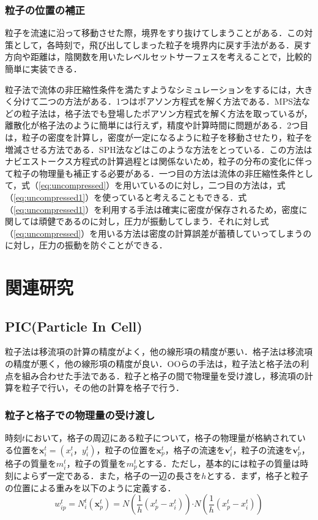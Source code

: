 \documentclass[a4j,12pt]{jreport}
\begin{document}
\subsubsection{粒子の位置の補正} \label{subsec:fixparticlepos}
粒子を流速に沿って移動させた際，境界をすり抜けてしまうことがある．この対策として，各時刻で，飛び出してしまった粒子を境界内に戻す手法がある．戻す方向や距離は，陰関数を用いたレベルセットサーフェスを考えることで，比較的簡単に実装できる．

粒子法で流体の非圧縮性条件を満たすようなシミュレーションをするには，大きく分けて二つの方法がある．1つはポアソン方程式を解く方法である．MPS法などの粒子法は，格子法でも登場したポアソン方程式を解く方法を取っているが，離散化が格子法のように簡単には行えず，精度や計算時間に問題がある．2つ目は，粒子の密度を計算し，密度が一定になるように粒子を移動させたり，粒子を増減させる方法である．SPH法などはこのような方法をとっている．この方法はナビエストークス方程式の計算過程とは関係ないため，粒子の分布の変化に伴って粒子の物理量も補正する必要がある．一つ目の方法は流体の非圧縮性条件として，式（\ref{eq:uncompressed}）を用いているのに対し，二つ目の方法は，式（\ref{eq:uncompressed1}）を使っていると考えることもできる．式（\ref{eq:uncompressed1}）を利用する手法は確実に密度が保存されるため，密度に関しては頑健であるのに対し，圧力が振動してしまう．それに対し式（\ref{eq:uncompressed}）を用いる方法は密度の計算誤差が蓄積していってしまうのに対し，圧力の振動を防ぐことができる．

\section{関連研究} \label{sec:reratedworks}
\subsection{PIC(Particle In Cell)} \label{subsec:PIC}
粒子法は移流項の計算の精度がよく，他の線形項の精度が悪い．格子法は移流項の精度が悪く，他の線形項の精度が良い．OOらの手法は，粒子法と格子法の利点を組み合わせた手法である．粒子と格子の間で物理量を受け渡し，移流項の計算を粒子で行い，その他の計算を格子で行う．
\subsubsection{粒子と格子での物理量の受け渡し} \label{subsec:P2GG2P}
時刻$t$において，格子の周辺にある粒子について，格子の物理量が格納されている位置を$\bm{x}^t_i = (x^t_i，y^t_i)$，粒子の位置を$\bm{x}^t_p$，格子の流速を$\bm{v}^t_i$，粒子の流速を$\bm{v}^t_p$，格子の質量を$m^t_i$，粒子の質量を$m^t_p$とする．ただし，基本的には粒子の質量は時刻によらず一定である．また，格子の一辺の長さを$h$とする．まず，格子と粒子の位置による重みを以下のように定義する．
\begin{equation}\label{eq:weight}
w^t_{ip} = N^t_i(\bm{x}^t_p) = N(\frac{1}{h}(x^t_p - x^t_i))\boldsymbol{\cdot}N(\frac{1}{h}(x^t_p - x^t_i))
\end{equation} 
\end{document}
